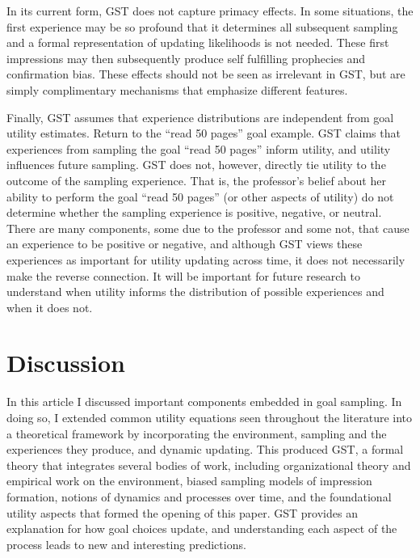 \documentclass[english,man]{apa6}
\theoremstyle{definition}
\theoremstyle{definition}
\theoremstyle{definition}
\theoremstyle{remark}
\begin{document}
In its current form, GST does not capture primacy effects. In some
situations, the first experience may be so profound that it determines
all subsequent sampling and a formal representation of updating
likelihoods is not needed. These first impressions may then subsequently
produce self fulfilling prophecies and confirmation bias. These effects
should not be seen as irrelevant in GST, but are simply complimentary
mechanisms that emphasize different features.

Finally, GST assumes that experience distributions are independent from
goal utility estimates. Return to the \enquote{read 50 pages} goal
example. GST claims that experiences from sampling the goal
\enquote{read 50 pages} inform utility, and utility influences future
sampling. GST does not, however, directly tie utility to the outcome of
the sampling experience. That is, the professor's belief about her
ability to perform the goal \enquote{read 50 pages} (or other aspects of
utility) do not determine whether the sampling experience is positive,
negative, or neutral. There are many components, some due to the
professor and some not, that cause an experience to be positive or
negative, and although GST views these experiences as important for
utility updating across time, it does not necessarily make the reverse
connection. It will be important for future research to understand when
utility informs the distribution of possible experiences and when it
does not.

\section{Discussion}\label{discussion}

In this article I discussed important components embedded in goal
sampling. In doing so, I extended common utility equations seen
throughout the literature into a theoretical framework by incorporating
the environment, sampling and the experiences they produce, and dynamic
updating. This produced GST, a formal theory that integrates several
bodies of work, including organizational theory and empirical work on
the environment, biased sampling models of impression formation, notions
of dynamics and processes over time, and the foundational utility
aspects that formed the opening of this paper. GST provides an
explanation for how goal choices update, and understanding each aspect
of the process leads to new and interesting predictions.
\end{document}
